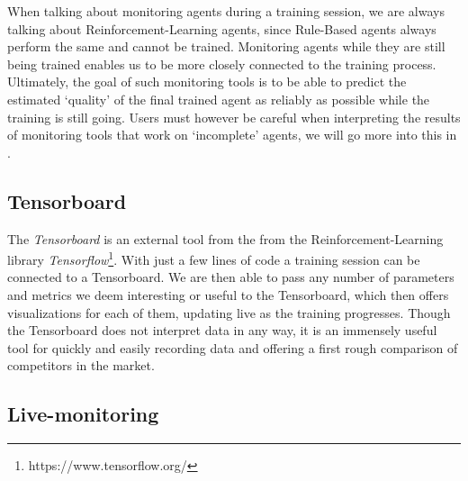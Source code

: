 When talking about monitoring agents during a training session, we are always talking about Reinforcement-Learning agents, since Rule-Based agents always perform the same and cannot be trained. Monitoring agents while they are still being trained enables us to be more closely connected to the training process. Ultimately, the goal of such monitoring tools is to be able to predict the estimated `quality' of the final trained agent as reliably as possible while the training is still going. Users must however be careful when interpreting the results of monitoring tools that work on `incomplete' agents, we will go more into this  in .

\subsection*{Tensorboard}\label{subsec:Tensorboard}

The \emph{Tensorboard} is an external tool from the from the Reinforcement-Learning library \emph{Tensorflow}\footnote[0][-0.2]{https://www.tensorflow.org/}. With just a few lines of code  a training session can be connected to a Tensorboard. We are then able to pass any number of parameters and metrics we deem interesting or useful to the Tensorboard, which then offers visualizations for each of them, updating live as the training progresses. Though the Tensorboard does not interpret data in any way, it is an immensely useful tool for quickly and easily recording data and offering a first rough comparison of competitors in the market.

\subsection*{Live-monitoring}\label{subsec:LiveMonitoring}

